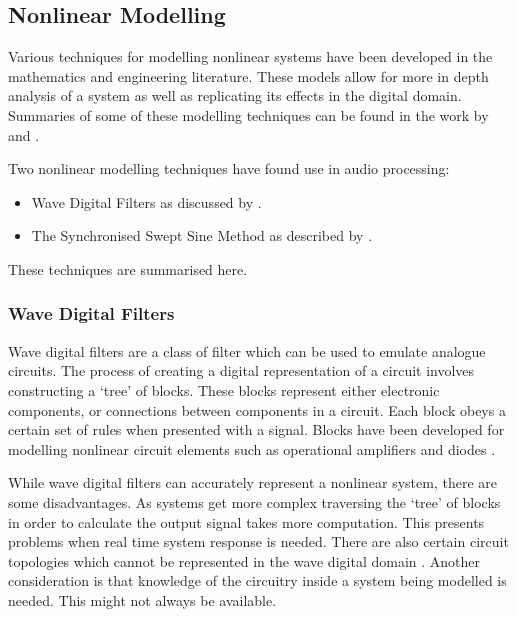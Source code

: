 	\subsection{Nonlinear Modelling}
	\label{sec:Excitation-Analysis-Modelling}
		Various techniques for modelling nonlinear systems have been developed in the mathematics and engineering
		literature. These models allow for more in depth analysis of a system as well as replicating its effects in
		the digital domain. Summaries of some of these modelling techniques can be found in the work by
		\citet{janczak2005identification} and \citet{ogunfunmi2007adaptive}.

		Two nonlinear modelling techniques have found use in audio processing:

		\begin{itemize}
			\item Wave Digital Filters as discussed by \citet{fettweis1986wave}.
			\item The Synchronised Swept Sine Method as described by \citet{novak2010nonlinear}.
		\end{itemize}

		These techniques are summarised here.

		\subsubsection{Wave Digital Filters}
			Wave digital filters are a class of filter which can be used to emulate analogue circuits. The
			process of creating a digital representation of a circuit involves constructing a `tree' of blocks.
			These blocks represent either electronic components, or connections between components in a
			circuit. Each block obeys a certain set of rules when presented with a signal. Blocks have been
			developed for modelling nonlinear circuit elements such as operational amplifiers and diodes
			\citep{paiva2012emulation}.

			While wave digital filters can accurately represent a nonlinear system, there are some
			disadvantages. As systems get more complex traversing the `tree' of blocks in order to calculate
			the output signal takes more computation. This presents problems when real time system response is
			needed. There are also certain circuit topologies which cannot be represented in the wave digital
			domain \citep{valimaki2011virtual}. Another consideration is that knowledge of the circuitry inside
			a system being modelled is needed. This might not always be available.

